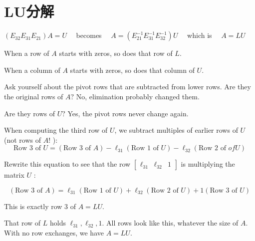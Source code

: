 \section{LU分解}

$ \left(E_{32} E_{31} E_{21}\right) A=U \quad $ becomes $ \quad A=\left(E_{21}^{-1} E_{31}^{-1} E_{32}^{-1}\right) U \quad $ which is $ \quad A=L U $

\begin{theorem}
    When a row of $A$ starts with zeros, so does that row of $L$.

    When a column of $A$ starts with zeros, so does that column of $U$.
\end{theorem}

\begin{example}
    Ask yourself about the pivot rows that are subtracted from lower rows. Are they the original rows of $ A ? $ No, elimination probably changed them.

    Are they rows of $ U ? $ Yes, the pivot rows never change again.

    When computing the third row of $ U $, we subtract multiples of earlier rows of $ U $ (not rows of $ A ! $ ):
    \begin{equation} \text{Row 3 of }  U=(\text{Row 3 of }  A)-\ell_{31}(
        \text{Row 1 of } U)-\ell_{32}(\text{Row 2 of }  of  U) \end{equation}

    Rewrite this equation to see that the row $ \left[\begin{array}{lll}\ell_{31} & \ell_{32} & 1\end{array}\right] $ is multiplying the matrix $ U $ :

    \begin{equation} (\text{Row 3 of } A)=\ell_{31}(\text{Row 1 of }  U)+\ell_{32}(\text{Row 2 of } U)+1(\text{Row 3 of }  U) \end{equation}

    This is exactly row 3 of $ A=L U . $

    That row of $
        L $ holds $ \ell_{31}, \ell_{32}, 1 . $ All rows look like this, whatever the size of $ A $. With no row exchanges, we have $ A=L U $.
\end{example}

